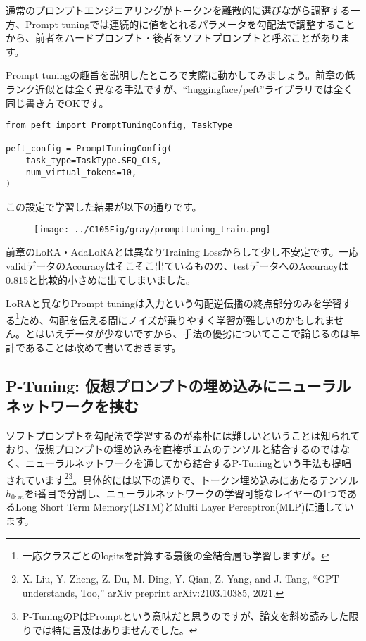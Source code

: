\documentclass[a5paper,twoside,dvipdfmx]{jsarticle}
\begin{document}
 

通常のプロンプトエンジニアリングがトークンを離散的に選びながら調整する一方、Prompt tuningでは連続的に値をとれるパラメータを勾配法で調整することから、前者をハードプロンプト・後者をソフトプロンプトと呼ぶことがあります。

Prompt tuningの趣旨を説明したところで実際に動かしてみましょう。前章の低ランク近似とは全く異なる手法ですが、``huggingface/peft''ライブラリでは全く同じ書き方でOKです。

\begin{lstlisting}
from peft import PromptTuningConfig, TaskType

peft_config = PromptTuningConfig(
    task_type=TaskType.SEQ_CLS,
    num_virtual_tokens=10,
)
\end{lstlisting}

この設定で学習した結果が以下の通りです。


\begin{figure}[h]
  \centering
  \texttt{[image: ../C105Fig/gray/prompttuning\_train.png]}
 \end{figure} 


前章のLoRA・AdaLoRAとは異なりTraining Lossからして少し不安定です。一応validデータのAccuracyはそこそこ出ているものの、testデータへのAccuracyは0.815と比較的小さめに出てしまいました。

LoRAと異なりPrompt tuningは入力という勾配逆伝播の終点部分のみを学習する\footnote{一応クラスごとのlogitsを計算する最後の全結合層も学習しますが。}ため、勾配を伝える間にノイズが乗りやすく学習が難しいのかもしれません。とはいえデータが少ないですから、手法の優劣についてここで論じるのは早計であることは改めて書いておきます。

\subsection{P-Tuning: 仮想プロンプトの埋め込みにニューラルネットワークを挟む}

ソフトプロンプトを勾配法で学習するのが素朴には難しいということは知られており、仮想プロンプトの埋め込みを直接ポエムのテンソルと結合するのではなく、ニューラルネットワークを通してから結合する\textsf{P-Tuning}という手法も提唱されています\footnote{X. Liu, Y. Zheng, Z. Du, M. Ding, Y. Qian, Z. Yang, and J. Tang, “GPT understands, Too,” arXiv preprint arXiv:2103.10385, 2021.}\footnote{P-TuningのPはPromptという意味だと思うのですが、論文を斜め読みした限りでは特に言及はありませんでした。}。具体的には以下の通りで、トークン埋め込みにあたるテンソル$h_{0:m}$をi番目で分割し、ニューラルネットワークの学習可能なレイヤーの1つであるLong Short Term Memory(LSTM)とMulti Layer Perceptron(MLP)に通しています。
\end{document}
